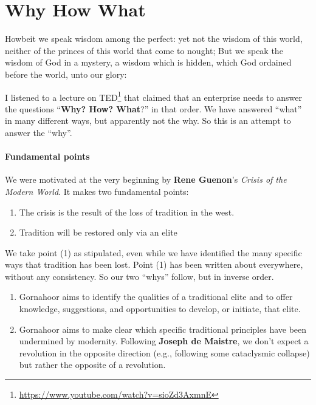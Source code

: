 \section{Why How What}

\begin{quotex}
Howbeit we speak wisdom among the perfect: yet not the wisdom of this world, neither of the princes of this world that come to nought; But we speak the wisdom of God in a mystery, a wisdom which is hidden, which God ordained before the world, unto our glory:
\end{quotex}


I listened to a lecture on TED\footnote{\url{https://www.youtube.com/watch?v=sioZd3AxmnE}} that claimed that an enterprise needs to answer the questions ``\textbf{Why? How? What}?'' in that order. We have answered ``what'' in many different ways, but apparently not the why. So this is an attempt to answer the ``why''.

\paragraph{Fundamental points}


We were motivated at the very beginning by \textbf{Rene Guenon}'s \emph{Crisis of the Modern World}. It makes two fundamental points:


\begin{enumerate}
\item The crisis is the result of the loss of tradition in the west.

\item Tradition will be restored only via an elite
\end{enumerate}


We take point (1) as stipulated, even while we have identified the many specific ways that tradition has been lost. Point (1) has been written about everywhere, without any consistency. So our two ``whys'' follow, but in inverse order.

\begin{enumerate}


\item Gornahoor aims to identify the qualities of a traditional elite and to offer knowledge, suggestions, and opportunities to develop, or initiate, that elite.

\item Gornahoor aims to make clear which specific traditional principles have been undermined by modernity. Following \textbf{Joseph de Maistre}, we don't expect a revolution in the opposite direction (e.g., following some cataclysmic collapse) but rather the opposite of a revolution.
\end{enumerate}


